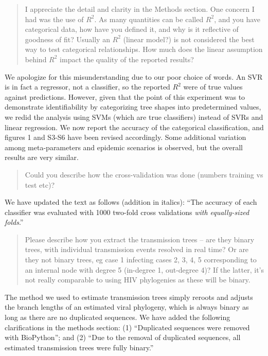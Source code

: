 \documentclass[12pt]{letter}
\begin{document}
\begin{letter}{ }
\begin{quote}
  \itshape

  I appreciate the detail and clarity in the Methods section. One concern I had
  was the use of $R^2$. As many quantities can be called $R^2$, and you have
  categorical data, how have you defined it, and why is it reflective of
  goodness of fit? Usually an $R^2$ (linear model?) is not considered the best
  way to test categorical relationships. How much does the linear assumption
  behind $R^2$ impact the quality of the reported results?
\end{quote}

We apologize for this misunderstanding due to our poor choice of words. An SVR
is in fact a regressor, not a classifier, so the reported $R^2$ were of true
values against predictions. However, given that the point of this experiment
was to demonstrate identifiability by categorizing tree shapes into
predetermined values, we redid the analysis using SVMs (which are true
classifiers) instead of SVRs and linear regression. We now report the accuracy
of the categorical classification, and figures 1 and S3-S6 have been revised
accordingly. Some additional variation among meta-parameters and epidemic
scenarios is observed, but the overall results are very similar.

\begin{quote}
  \itshape

  Could you describe how the cross-validation was done (numbers training vs
  test etc)?
\end{quote}

We have updated the text as follows (addition in italics): ``The accuracy of
each classifier was evaluated with 1000 two-fold cross validations \emph{with
equally-sized folds}.''

\begin{quote}
  \itshape

  Please describe how you extract the transmission trees -- are they binary
  trees, with individual transmission events resolved in real time? Or are they
  not binary trees, eg case 1 infecting cases 2, 3, 4, 5 corresponding to an
  internal node with degree 5 (in-degree 1, out-degree 4)? If the latter, it's
  not really comparable to using HIV phylogenies as these will be binary.
\end{quote}

The method we used to estimate transmission trees simply reroots and adjusts
the branch lengths of an estimated viral phylogeny, which is always binary as
long as there are no duplicated sequences. We have added the following
clarifications in the methods section: (1) ``Duplicated sequences were removed
with BioPython''; and (2) ``Due to the removal of duplicated sequences, all
estimated transmission trees were fully binary.''


\end{letter}
\end{document}
